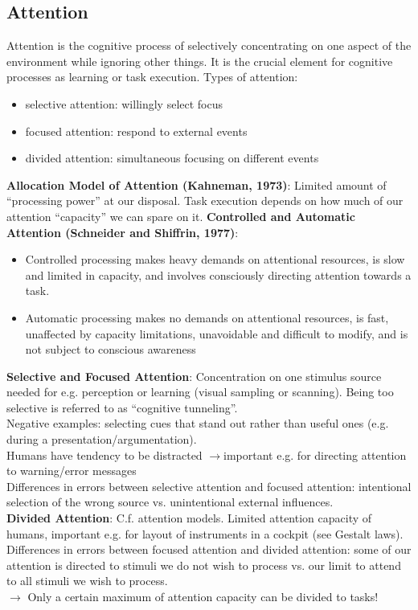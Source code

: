 \subsection{Attention}
Attention is the cognitive process of selectively concentrating on one aspect of the environment while ignoring other things. It is the crucial element for cognitive processes as
learning or task execution. Types of attention:
\begin{itemize}
\item selective attention: willingly select focus
\item focused attention: respond to external events
\item divided attention: simultaneous focusing on different events
\end{itemize}
\textbf{Allocation Model of Attention (Kahneman, 1973)}:
Limited amount of ``processing power'' at our disposal. Task execution depends on how much of our attention ``capacity'' we can spare on it.
\textbf{Controlled and Automatic Attention (Schneider and Shiffrin, 1977)}:
\begin{itemize}
\item Controlled processing makes heavy demands on attentional resources, is slow and limited in capacity, and involves consciously directing attention towards a task.
\item Automatic processing makes no demands on attentional resources, is fast, unaffected by capacity limitations, unavoidable and difficult to modify, and is not subject to conscious awareness
\end{itemize}
\textbf{Selective and Focused Attention}:
Concentration on one stimulus source needed for e.g. perception or learning (visual sampling or scanning). Being too selective is referred to as ``cognitive tunneling''.\\
Negative examples: selecting cues that stand out rather than useful ones (e.g. during a presentation/argumentation).\\
Humans have tendency to be distracted $\rightarrow$important e.g. for directing attention to warning/error messages\\
Differences in errors between selective attention and focused attention: intentional selection of the wrong source vs. unintentional external influences.\\
\textbf{Divided Attention}:
C.f. attention models. Limited attention capacity of humans, important e.g. for layout of instruments in a cockpit (see Gestalt laws). Differences in errors between focused attention and
divided attention: some of our attention is directed to stimuli we do not wish to process vs. our limit to attend to all stimuli we wish to process.\\
$\rightarrow$ Only a certain maximum of attention capacity can be divided to tasks!\\


